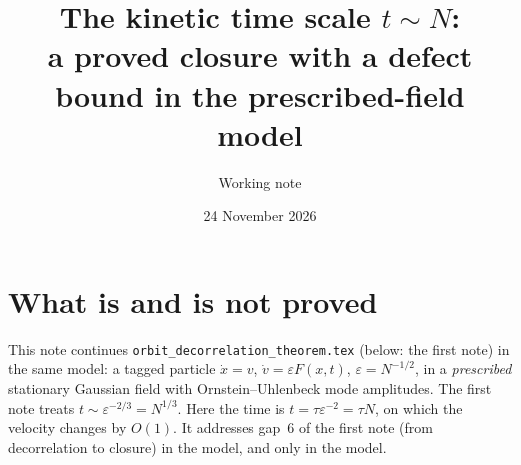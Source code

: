 \documentclass[11pt]{article}
\title{The kinetic time scale $t\sim N$:\\
a proved closure with a defect bound in the prescribed-field model}
\author{Working note}
\date{24 November 2026}
\newcommand{\eps}{\varepsilon}
\theoremstyle{remark}
\begin{document}
\maketitle

\section{What is and is not proved}

This note continues \texttt{orbit\_decorrelation\_theorem.tex} (below: the
first note) in the same model: a tagged particle $\dot x=v$,
$\dot v=\eps F(x,t)$, $\eps=N^{-1/2}$, in a \emph{prescribed} stationary
Gaussian field with Ornstein--Uhlenbeck mode amplitudes. The first note
treats $t\sim\eps^{-2/3}=N^{1/3}$. Here the time is $t=\tau\eps^{-2}=\tau N$,
on which the velocity changes by $O(1)$. It addresses gap~6 of the first
note (from decorrelation to closure) in the model, and only in the model.
\end{document}
